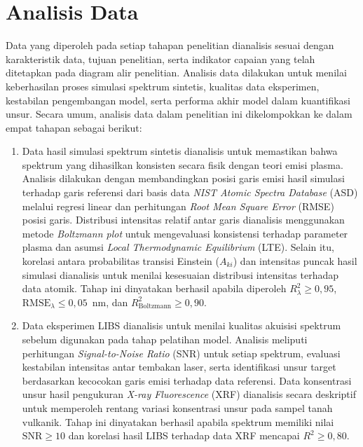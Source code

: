 \section{Analisis Data}
Data yang diperoleh pada setiap tahapan penelitian dianalisis sesuai dengan karakteristik data, tujuan penelitian, serta indikator capaian yang telah ditetapkan pada diagram alir penelitian. Analisis data dilakukan untuk menilai keberhasilan proses simulasi spektrum sintetis, kualitas data eksperimen, kestabilan pengembangan model, serta performa akhir model dalam kuantifikasi unsur. Secara umum, analisis data dalam penelitian ini dikelompokkan ke dalam empat tahapan sebagai berikut:
\begin{enumerate}
    \item Data hasil simulasi spektrum sintetis dianalisis untuk memastikan bahwa spektrum yang dihasilkan konsisten secara fisik dengan teori emisi plasma. Analisis dilakukan dengan membandingkan posisi garis emisi hasil simulasi terhadap garis referensi dari basis data \textit{NIST Atomic Spectra Database} (ASD) melalui regresi linear dan perhitungan \textit{Root Mean Square Error} (RMSE) posisi garis. Distribusi intensitas relatif antar garis dianalisis menggunakan metode \textit{Boltzmann plot} untuk mengevaluasi konsistensi terhadap parameter plasma dan asumsi \textit{Local Thermodynamic Equilibrium} (LTE). Selain itu, korelasi antara probabilitas transisi Einstein ($A_{ki}$) dan intensitas puncak hasil simulasi dianalisis untuk menilai kesesuaian distribusi intensitas terhadap data atomik. Tahap ini dinyatakan berhasil apabila diperoleh $R^2_{\lambda} \geq 0{,}95$, $\mathrm{RMSE}_{\lambda} \leq 0{,}05$~nm, dan $R^2_{\mathrm{Boltzmann}} \geq 0{,}90$.

    \item Data eksperimen LIBS dianalisis untuk menilai kualitas akuisisi spektrum sebelum digunakan pada tahap pelatihan model. Analisis meliputi perhitungan \textit{Signal-to-Noise Ratio} (SNR) untuk setiap spektrum, evaluasi kestabilan intensitas antar tembakan laser, serta identifikasi unsur target berdasarkan kecocokan garis emisi terhadap data referensi. Data konsentrasi unsur hasil pengukuran \textit{X-ray Fluorescence} (XRF) dianalisis secara deskriptif untuk memperoleh rentang variasi konsentrasi unsur pada sampel tanah vulkanik. Tahap ini dinyatakan berhasil apabila spektrum memiliki nilai $\mathrm{SNR} \geq 10$ dan korelasi hasil LIBS terhadap data XRF mencapai $R^2 \geq 0{,}80$.


\end{enumerate}

